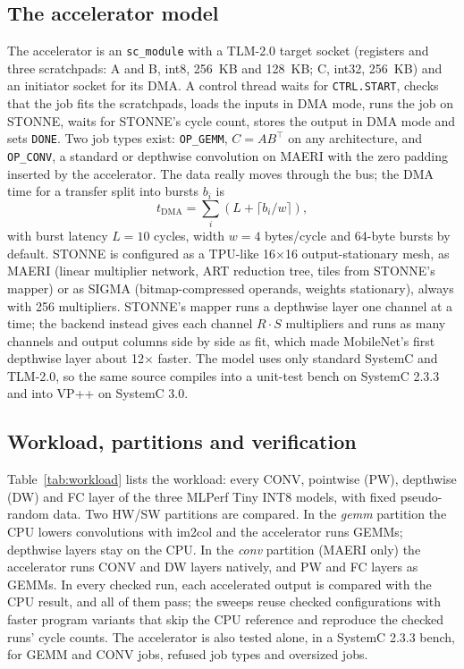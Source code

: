 \documentclass[conference]{IEEEtran}
\begin{document}
\subsection{The accelerator model}
The accelerator is an \texttt{sc\_module} with a TLM-2.0 target socket (registers and three scratchpads: A and B, int8, 256~KB and 128~KB; C, int32, 256~KB) and an initiator socket for its DMA. A control thread waits for \texttt{CTRL.START}, checks that the job fits the scratchpads, loads the inputs in DMA mode, runs the job on STONNE, waits for STONNE's cycle count, stores the output in DMA mode and sets \texttt{DONE}. Two job types exist: \texttt{OP\_GEMM}, $C=AB^\top$ on any architecture, and \texttt{OP\_CONV}, a standard or depthwise convolution on MAERI with the zero padding inserted by the accelerator. The data really moves through the bus; the DMA time for a transfer split into bursts $b_i$ is
\begin{equation}
t_{\mathrm{DMA}} = \sum_i \left( L + \lceil b_i / w \rceil \right),
\label{eq:dma}
\end{equation}
with burst latency $L=10$ cycles, width $w=4$ bytes/cycle and 64-byte bursts by default. STONNE is configured as a TPU-like 16$\times$16 output-stationary mesh, as MAERI (linear multiplier network, ART reduction tree, tiles from STONNE's mapper) or as SIGMA (bitmap-compressed operands, weights stationary), always with 256 multipliers. STONNE's mapper runs a depthwise layer one channel at a time; the backend instead gives each channel $R{\cdot}S$ multipliers and runs as many channels and output columns side by side as fit, which made MobileNet's first depthwise layer about 12$\times$ faster. The model uses only standard SystemC and TLM-2.0, so the same source compiles into a unit-test bench on SystemC 2.3.3 and into VP++ on SystemC 3.0.

\subsection{Workload, partitions and verification}
Table~\ref{tab:workload} lists the workload: every CONV, pointwise (PW), depthwise (DW) and FC layer of the three MLPerf Tiny INT8 models, with fixed pseudo-random data. Two HW/SW partitions are compared. In the \emph{gemm} partition the CPU lowers convolutions with im2col and the accelerator runs GEMMs; depthwise layers stay on the CPU. In the \emph{conv} partition (MAERI only) the accelerator runs CONV and DW layers natively, and PW and FC layers as GEMMs. In every checked run, each accelerated output is compared with the CPU result, and all of them pass; the sweeps reuse checked configurations with faster program variants that skip the CPU reference and reproduce the checked runs' cycle counts. The accelerator is also tested alone, in a SystemC 2.3.3 bench, for GEMM and CONV jobs, refused job types and oversized jobs.
\end{document}

